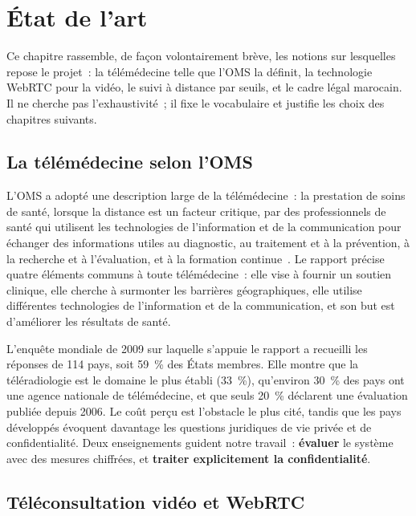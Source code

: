 \chapter{État de l'art}
\label{chap:etat}

\introchap

Ce chapitre rassemble, de façon volontairement brève, les notions sur lesquelles repose le projet~: la télémédecine telle que l'\ac{OMS} la définit, la technologie WebRTC pour la vidéo, le suivi à distance par seuils, et le cadre légal marocain. Il ne cherche pas l'exhaustivité~; il fixe le vocabulaire et justifie les choix des chapitres suivants.

\section{La télémédecine selon l'OMS}

L'\ac{OMS} a adopté une description large de la télémédecine~: la prestation de soins de santé, lorsque la distance est un facteur critique, par des professionnels de santé qui utilisent les technologies de l'information et de la communication pour échanger des informations utiles au diagnostic, au traitement et à la prévention, à la recherche et à l'évaluation, et à la formation continue~\cite{oms2010}. Le rapport précise quatre éléments communs à toute télémédecine~: elle vise à fournir un soutien clinique, elle cherche à surmonter les barrières géographiques, elle utilise différentes technologies de l'information et de la communication, et son but est d'améliorer les résultats de santé.

L'enquête mondiale de 2009 sur laquelle s'appuie le rapport a recueilli les réponses de 114 pays, soit 59~\% des États membres. Elle montre que la téléradiologie est le domaine le plus établi (33~\%), qu'environ 30~\% des pays ont une agence nationale de télémédecine, et que seuls 20~\% déclarent une évaluation publiée depuis 2006. Le coût perçu est l'obstacle le plus cité, tandis que les pays développés évoquent davantage les questions juridiques de vie privée et de confidentialité. Deux enseignements guident notre travail~: \textbf{évaluer} le système avec des mesures chiffrées, et \textbf{traiter explicitement la confidentialité}.

\section{Téléconsultation vidéo et WebRTC}

